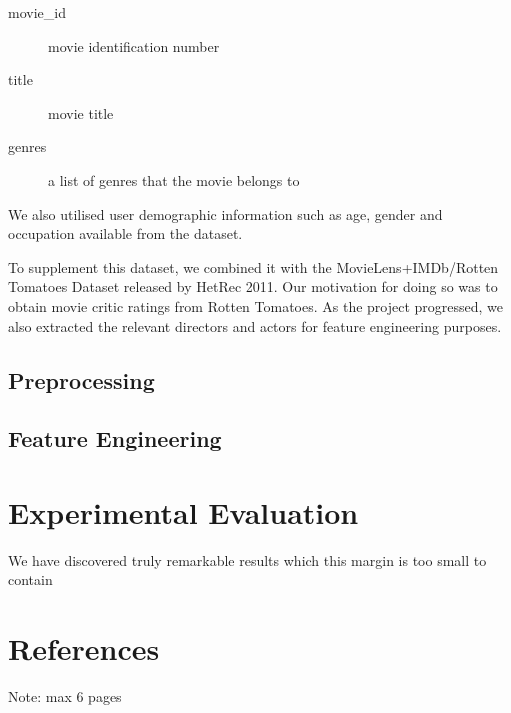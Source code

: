 \documentclass[letterpaper]{article}
\begin{document}
\begin{description}
	\item[movie\_id] movie identification number
	\item[title] movie title
	\item[genres] a list of genres that the movie belongs to
\end{description}

We also utilised user demographic information such as age, gender and occupation available from the dataset.

To supplement this dataset, we combined it with the MovieLens+IMDb/Rotten Tomatoes Dataset released by HetRec 2011. Our motivation for doing so was to obtain movie critic ratings from Rotten Tomatoes. As the project progressed, we also extracted the relevant directors and actors for feature engineering purposes.

\subsection{Preprocessing}

\subsection{Feature Engineering}

\section{Experimental Evaluation}
We have discovered truly remarkable results which this margin is too small to contain

\section{References}
Note: max 6 pages
\end{document}
